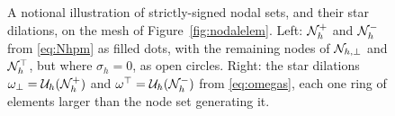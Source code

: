 \begin{figure}[ht]
\caption{A notional illustration of strictly-signed nodal sets, and their star dilations, on the mesh of Figure~\ref{fig:nodalelem}.  Left: $\mathcal{N}_h^+$ and $\mathcal{N}_h^-$ from \eqref{eq:Nhpm} as filled dots, with the remaining nodes of $\mathcal{N}_{h,\bot}$ and $\mathcal{N}_h^\top$, but where $\sigma_h=0$, as open circles.  Right: the star dilations $\omega_\bot = \mathcal{U}_h(\mathcal{N}_h^+)$ and $\omega^\top = \mathcal{U}_h(\mathcal{N}_h^-)$ from \eqref{eq:omegas}, each one ring of elements larger than the node set generating it.}
\label{fig:stardilate}
\end{figure}
